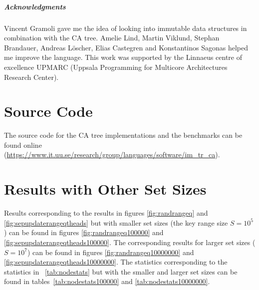 \documentclass[a4paper,UKenglish]{oasics}
\begin{document}

\subparagraph*{Acknowledgments}

Vincent Gramoli gave me the idea of looking into immutable data structures in combination with the CA tree.
Amelie Lind, Martin Viklund, Stephan Brandauer, Andreas Löscher, Elias Castegren and Konstantinos Sagonas helped me improve the language.
This work was supported by the Linnaeus centre of excellence UPMARC (Uppsala Programming for Multicore
Architectures Research Center).
 
\appendix
\section{Source Code}
The source code for the CA tree implementations and the benchmarks can be found online (\url{https://www.it.uu.se/research/group/languages/software/im_tr_ca}).

\section{Results with Other Set Sizes}
Results corresponding to the results in figures \ref{fig:randrangeq} and \ref{fig:sepupdaterangeqtheads} but with smaller set sizes (the key range size $S=10^5$) can be found in figures \ref{fig:randrangeq100000} and \ref{fig:sepupdaterangeqtheads100000}.
The corresponding results for larger set sizes ($S=10^7$) can be found in figures \ref{fig:randrangeq10000000} and \ref{fig:sepupdaterangeqtheads10000000}.
The statistics corresponding to the statistics in \tablename~\ref{tab:nodestats} but with the smaller and larger set sizes can be found in tables~\ref{tab:nodestats100000} and \ref{tab:nodestats10000000}.
\end{document}
